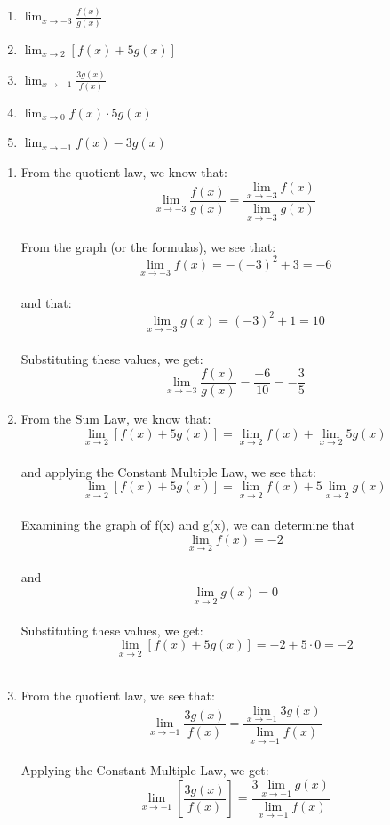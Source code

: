 \begin{Exercise}
    [title = Limits Practice 6, label=limits6_ivt]
\begin{enumerate}
    \item $\lim_{x\to-3} \frac{f(x)}{g(x)}$
    \item $\lim_{x\to2}\left[f(x) + 5g(x)\right]$
    \item $\lim_{x\to-1} \frac{3g(x)}{f(x)}$
    \item $\lim_{x\to0}f(x) \cdot 5g(x)$
    \item $\lim_{x\to-1} f(x) - 3g(x) $
\end{enumerate}
\vspace{40mm}
\end{Exercise}
\begin{Answer}
    [ref=limits6_ivt]
    \begin{enumerate}
        \item From the quotient law, we know that:
        $$\lim_{x\to-3}\frac{f(x)}{g(x)}=\frac{\lim_{x\to-3}f(x)}{\lim_{x\to-3}g(x)}$$\\
        From the graph (or the formulas), we see that:
        $$\lim_{x\to-3}f(x) = -(-3)^2 + 3 = -6$$ \\
        and that:
        $$\lim_{x\to-3}g(x) = (-3)^2 + 1 = 10$$ \\
        Substituting these values, we get:
        $$\lim_{x\to-3}\frac{f(x)}{g(x)}=\frac{-6}{10} = -\frac{3}{5}$$
        \item From the Sum Law, we know that: 
        $$\lim_{x\to2}\left[f(x) + 5g(x)\right]=\lim_{x\to2}f(x) + \lim_{x\to2}5g(x)$$\\
        and applying the Constant Multiple Law, we see that: 
        $$\lim_{x\to2}\left[f(x) + 5g(x)\right]=\lim_{x\to2}f(x) + 5\lim_{x\to2}g(x)$$\\
        Examining the graph of f(x) and g(x), we can determine that 
        $$\lim_{x\to2}f(x) = -2$$ \\
        and 
        $$\lim_{x\to2}g(x) = 0$$\\ 
        Substituting these values, we get: 
        $$\lim_{x\to2}\left[f(x) + 5g(x)\right]=-2 + 5 \cdot 0 = -2$$\\
        \item From the quotient law, we see that: 
        $$\lim_{x\to-1} \frac{3g(x)}{f(x)}=\frac{\lim_{x\to-1}3g(x)}{\lim_{x\to-1}f(x)}$$\\ 
        Applying the Constant Multiple Law, we get: 
        $$\lim_{x\to-1} \left[\frac{3g(x)}{f(x)}\right]=\frac{3\lim_{x\to-1}g(x)}{\lim_{x\to-1}f(x)}$$\\ 

\end{enumerate}
\end{Answer}
